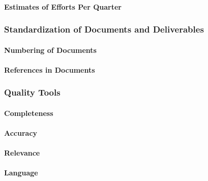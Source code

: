\documentclass[
  11pt,
]{article}
\begin{document}
\hypertarget{estimates-of-efforts-per-quarter}{%
\paragraph{Estimates of Efforts Per
Quarter}\label{estimates-of-efforts-per-quarter}}

\hypertarget{standardization-of-documents-and-deliverables}{%
\subsubsection{Standardization of Documents and
Deliverables}\label{standardization-of-documents-and-deliverables}}

\hypertarget{numbering-of-documents}{%
\paragraph{Numbering of Documents}\label{numbering-of-documents}}

\hypertarget{references-in-documents}{%
\paragraph{References in Documents}\label{references-in-documents}}

\hypertarget{quality-tools}{%
\subsubsection{Quality Tools}\label{quality-tools}}

\hypertarget{completeness}{%
\paragraph{Completeness}\label{completeness}}

\hypertarget{accuracy}{%
\paragraph{Accuracy}\label{accuracy}}

\hypertarget{relevance}{%
\paragraph{Relevance}\label{relevance}}

\hypertarget{language}{%
\paragraph{Language}\label{language}}
\end{document}
